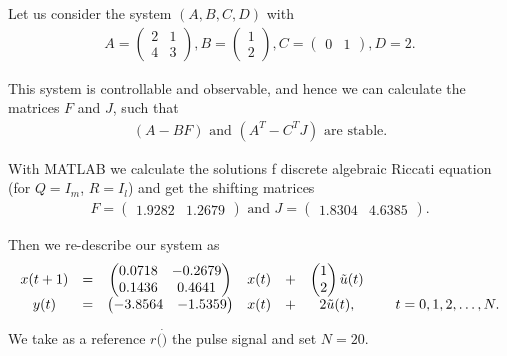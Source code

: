 \begin{exam}
	\label{ex:ILC:LQR}
Let us consider the system $(A,B,C,D)$ with 
\begin{align}
\label{eq:ILC:Sys_ex1_origin}
A = \begin{pmatrix}
2 & 1 \\  4 & 3
\end{pmatrix}, B = \begin{pmatrix}
1 \\ 2
\end{pmatrix}, C = \begin{pmatrix}
0 & 1
\end{pmatrix}, D = 2.
\end{align}

This system is controllable and observable, and hence we can calculate the matrices $F$ and $J$, such that 
\begin{align}
(A - BF) \text{ and } (A^T - C^T J) \text{ are stable}. 
\end{align}

With MATLAB we calculate the solutions f discrete algebraic Riccati equation (for $Q = I_m$, $R = I_l$) and get the shifting matrices 
\begin{align}
F =\begin{pmatrix}
 1.9282   & 1.2679
\end{pmatrix} \text{ and } 
J = \begin{pmatrix}
1.8304  &  4.6385
\end{pmatrix}. 
\end{align}


Then we re-describe our system as
\begin{align}
\label{eq:ILC:Sys_ex1}
\begin{array}{c c c c c c c c c}
x(t+1) &=&
\begin{pmatrix}
0.0718  & -0.2679\\
0.1436  &  0.4641
\end{pmatrix}
& x(t) &+& 
\begin{pmatrix}
1 \\ 2
\end{pmatrix}
\tilde{u}(t)& &
\\ 
y(t)   &=& \begin{pmatrix}
	-3.8564 &   -1.5359
\end{pmatrix}
& x(t)& +&
 2 \tilde{u} (t),& &\; t = 0, 1, 2, \dots, N. 
\end{array}
\end{align} 

We take as a reference $r(\dot)$ the pulse signal and set $N = 20$. 


\end{exam}

